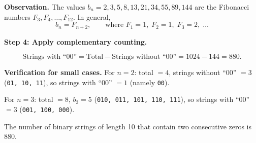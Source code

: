\documentclass[12pt, a4paper]{article}
\begin{document}
\textbf{Observation.}\; The values $b_n = 2, 3, 5, 8, 13, 21, 34, 55, 89, 144$
are the Fibonacci numbers $F_3, F_4, \ldots, F_{12}$.
In general,
\[
  \boxed{b_n = F_{n+2}}, \qquad \text{where } F_1 = 1,\; F_2 = 1,\; F_3 = 2,\; \ldots
\]

\textbf{Step 4: Apply complementary counting.}

\[
  \text{Strings with ``$00$''} = \text{Total} - \text{Strings without ``$00$''}
  = 1024 - 144 = \boxed{880}.
\]

\textbf{Verification for small cases.}\;
For $n = 2$: total $= 4$, strings without ``$00$'' $= 3$ (\texttt{01, 10, 11}),
so strings with ``$00$'' $= 1$ (namely \texttt{00}). \checkmark

For $n = 3$: total $= 8$, $b_3 = 5$ (\texttt{010, 011, 101, 110, 111}),
so strings with ``$00$'' $= 3$ (\texttt{001, 100, 000}). \checkmark

\begin{answerbox}
\centering
The number of binary strings of length 10 that contain two consecutive zeros is
$\boxed{880}$.
\end{answerbox}
\end{document}
